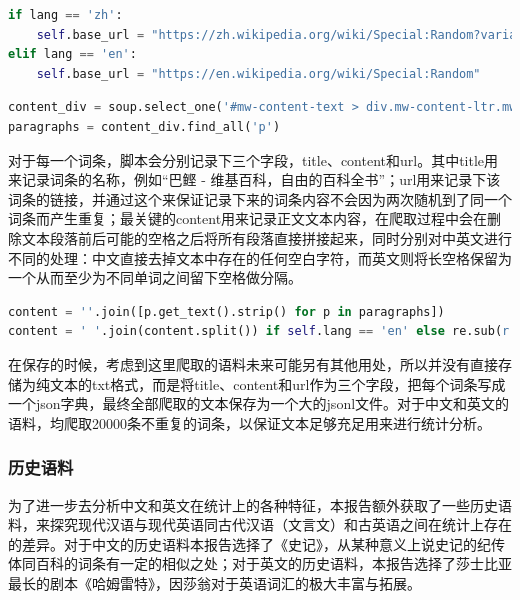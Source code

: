 \documentclass[11pt]{article}
\begin{document}
	\begin{lstlisting}[language=Python, label=code2.1]
if lang == 'zh':
	self.base_url = "https://zh.wikipedia.org/wiki/Special:Random?variant=zh-cn"    #加上zh-cn确保爬下来的是大陆简体中文
elif lang == 'en':
	self.base_url = "https://en.wikipedia.org/wiki/Special:Random"
	\end{lstlisting}
	
	\begin{lstlisting}[language=Python, label=code2.2]
content_div = soup.select_one('#mw-content-text > div.mw-content-ltr.mw-parser-output')	# 直接定位到该路径
paragraphs = content_div.find_all('p')
	\end{lstlisting}
	
	对于每一个词条，脚本会分别记录下三个字段，title、content和url。其中title用来记录词条的名称，例如“巴鲣 - 维基百科，自由的百科全书”；url用来记录下该词条的链接，并通过这个来保证记录下来的词条内容不会因为两次随机到了同一个词条而产生重复；最关键的content用来记录正文文本内容，在爬取过程中会在删除文本段落前后可能的空格之后将所有段落直接拼接起来，同时分别对中英文进行不同的处理：中文直接去掉文本中存在的任何空白字符，而英文则将长空格保留为一个从而至少为不同单词之间留下空格做分隔。
	
	\begin{lstlisting}[language=Python, label=code2.3]
content = ''.join([p.get_text().strip() for p in paragraphs]) 
content = ' '.join(content.split()) if self.lang == 'en' else re.sub(r'\s+', '', content)   # 分情况处理，英文需要用空格来分隔单词，中文直接可以把空白字符给去掉
	\end{lstlisting}
	
	在保存的时候，考虑到这里爬取的语料未来可能另有其他用处，所以并没有直接存储为纯文本的txt格式，而是将title、content和url作为三个字段，把每个词条写成一个json字典，最终全部爬取的文本保存为一个大的jsonl文件。对于中文和英文的语料，均爬取20000条不重复的词条，以保证文本足够充足用来进行统计分析。
	
	\subsubsection{历史语料}
	为了进一步去分析中文和英文在统计上的各种特征，本报告额外获取了一些历史语料，来探究现代汉语与现代英语同古代汉语（文言文）和古英语之间在统计上存在的差异。对于中文的历史语料本报告选择了《史记》，从某种意义上说史记的纪传体同百科的词条有一定的相似之处；对于英文的历史语料，本报告选择了莎士比亚最长的剧本《哈姆雷特》，因莎翁对于英语词汇的极大丰富与拓展。
\end{document}
